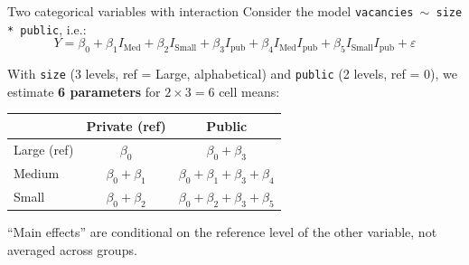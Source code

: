 \documentclass[10pt,ignorenonframetext,aspectratio=169]{beamer}
\begin{document}
\begin{frame}{Two categorical variables with interaction}
    Consider the model \texttt{vacancies $\sim$ size * public}, i.e.:
    \[
    Y = \beta_0 + \beta_1 I_{\text{Med}} + \beta_2 I_{\text{Small}} + \beta_3 I_{\text{pub}} + \beta_4 I_{\text{Med}} I_{\text{pub}} + \beta_5 I_{\text{Small}} I_{\text{pub}} + \varepsilon
    \]

    \medskip
    With \texttt{size} (3 levels, ref = Large, alphabetical) and \texttt{public} (2 levels, ref = 0), we estimate \textbf{6 parameters} for $2 \times 3 = 6$ cell means:

    \begin{table}[h]\centering\small
    \begin{tabular}{l|cc}
    & Private (ref) & Public \\
    \hline
    Large (ref) & $\beta_0$ & $\beta_0 + \beta_3$ \\
    Medium & $\beta_0 + \beta_1$ & $\beta_0 + \beta_1 + \beta_3 + \beta_4$ \\
    Small & $\beta_0 + \beta_2$ & $\beta_0 + \beta_2 + \beta_3 + \beta_5$ \\
    \end{tabular}
    \end{table}

    \medskip
    \alert{``Main effects'' are conditional on the reference level} of the other variable, not averaged across groups.
\end{frame}
\end{document}
